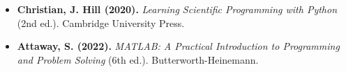 \begin{itemize}
    \item \textbf{Christian, J. Hill (2020).} \emph{Learning Scientific Programming with Python} (2nd ed.). Cambridge University Press.  
    \item \textbf{Attaway, S. (2022).} \emph{MATLAB: A Practical Introduction to Programming and Problem Solving} (6th ed.). Butterworth-Heinemann.  
\end{itemize}
